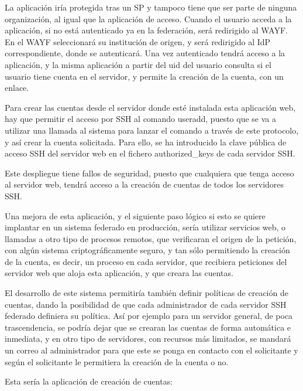     La aplicación iría protegida tras un SP y tampoco tiene que ser parte
    de ninguna organización, al igual que la aplicación de acceso. Cuando
    el usuario acceda a la aplicación, si no está autenticado ya en la
    federación, será redirigido al WAYF. En el WAYF seleccionará su
    institución de origen, y será redirigido al IdP correspondiente, donde
    se autenticará. Una vez autenticado tendrá acceso a la aplicación, y la
    misma aplicación a partir del uid del usuario consulta si el usuario
    tiene cuenta en el servidor, y permite la creación de la cuenta, con un
    enlace.

    Para crear las cuentas desde el servidor donde esté instalada esta
    aplicación web, hay que permitir el acceso por SSH al comando useradd,
    puesto que se va a utilizar una llamada al sistema para lanzar el
    comando a través de este protocolo, y así crear la cuenta solicitada.
    Para ello, se ha introducido la clave pública de acceso SSH del
    servidor web en el fichero authorized\_keys de cada servidor SSH.

    Este despliegue tiene fallos de seguridad, puesto que cualquiera que
    tenga acceso al servidor web, tendrá acceso a la creación de cuentas de
    todos los servidores SSH.

    Una mejora de esta aplicación, y el siguiente paso lógico si esto se
    quiere implantar en un sistema federado en producción, sería utilizar
    servicios web, o llamadas a otro tipo de procesos remotos, que
    verificaran el origen de la petición, con algún sistema
    criptográficamente seguro, y tan sólo permitiendo la creación de la
    cuenta, es decir, un proceso en cada servidor, que recibiera peticiones
    del servidor web que aloja esta aplicación, y que creara las cuentas.

    El desarrollo de este sistema permitiría también definir políticas de
    creación de cuentas, dando la posibilidad de que cada administrador de
    cada servidor SSH federado definiera su política. Así por ejemplo para
    un servidor general, de poca trascendencia, se podría dejar que se
    crearan las cuentas de forma automática e inmediata, y en otro tipo de
    servidores, con recursos más limitados, se mandará un correo al
    administrador para que este se ponga en contacto con el solicitante y
    según el solicitante le permitiera la creación de la cuenta o no.

    Esta sería la aplicación de creación de cuentas:
     
